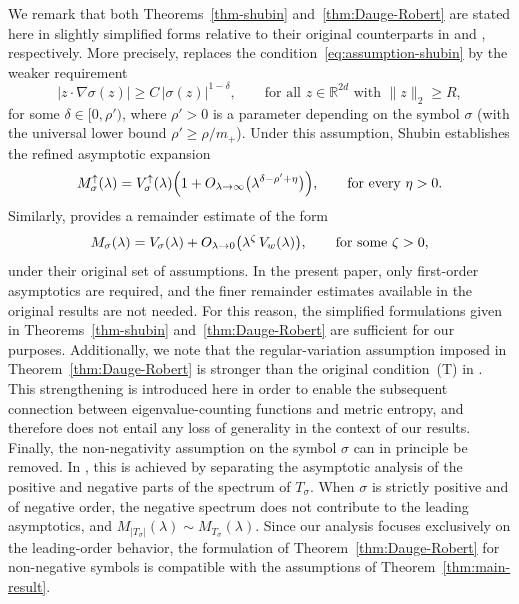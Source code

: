 \documentclass[a4paper,12pt]{article}
\let\originalleft\left
\let\originalright\right
\renewcommand{\left}{\mathopen{}\mathclose\bgroup\originalleft}
\renewcommand{\right}{\aftergroup\egroup\originalright}
\newcommand{\R}{\mathbb{R}}
\newcommand{\ecfup}{M^{\uparrow}}
\newcommand{\volup}{V^{\uparrow}}
\begin{document}
\noindent
We remark that both Theorems~\ref{thm-shubin} and~\ref{thm:Dauge-Robert} are stated
here in slightly simplified forms relative to their original counterparts in
\cite[Theorem~30.1]{shubin_pseudodifferential_2001} and
\cite[Theorem~1.3]{dauge1987weyl}, respectively.
More precisely, \cite[Theorem~30.1]{shubin_pseudodifferential_2001} replaces the
condition~\eqref{eq:assumption-shubin} by the weaker requirement
\begin{equation}\label{eq:assumption-shubin2}
    |z \cdot \nabla \sigma(z)|
    \ge
    C\,|\sigma(z)|^{1-\delta},
    \qquad
    \text{for all } z \in \R^{2d} \text{ with } \|z\|_2 \ge R,
\end{equation}
for some $\delta \in [0,\rho')$, where $\rho'>0$ is a parameter depending on the
symbol $\sigma$ (with the universal lower bound $\rho' \ge \rho/m_+$).
Under this assumption, Shubin establishes the refined asymptotic expansion
\[
    \ecfup_\sigma(\lambda)
    =
    \volup_\sigma(\lambda)
    \left(
        1
        +
        O_{\lambda\to\infty}
        \bigl(\lambda^{\delta-\rho'+\eta}\bigr)
    \right),
    \qquad
    \text{for every } \eta>0.
\]
Similarly, \cite[Theorem~1.3]{dauge1987weyl} provides a remainder estimate of the
form
\[
    M_\sigma(\lambda)
    =
    V_\sigma(\lambda)
    +
    O_{\lambda\to0}
    \left(
        \lambda^{\zeta}\,V_w(\lambda)
    \right),
    \qquad
    \text{for some } \zeta>0,
\]
under their original set of assumptions. %
In the present paper, only first-order asymptotics are required, and the finer
remainder estimates available in the original results are not needed.
For this reason, the simplified formulations given in
Theorems~\ref{thm-shubin} and~\ref{thm:Dauge-Robert} are sufficient for our
purposes. 
Additionally, we note that the regular-variation assumption imposed in
Theorem~\ref{thm:Dauge-Robert} is stronger than the original condition~(T) in
\cite{dauge1987weyl}. This strengthening is introduced here in order to enable the
subsequent connection between eigenvalue-counting functions and metric entropy,
and therefore does not entail any loss of generality in the context of our
results. Finally, the non-negativity assumption on the symbol $\sigma$ can in principle be
removed. In \cite{dauge1987weyl}, this is achieved by separating the asymptotic
analysis of the positive and negative parts of the spectrum of $T_\sigma$. 
When
$\sigma$ is strictly positive and of negative order, the negative spectrum 
does not contribute to the leading asymptotics,
and $M_{|T_\sigma|} (\lambda) \sim M_{T_\sigma} (\lambda)$. Since our analysis
focuses exclusively on the leading-order behavior, the formulation of
Theorem~\ref{thm:Dauge-Robert} for non-negative symbols is compatible with the
assumptions of Theorem~\ref{thm:main-result}.
\end{document}
